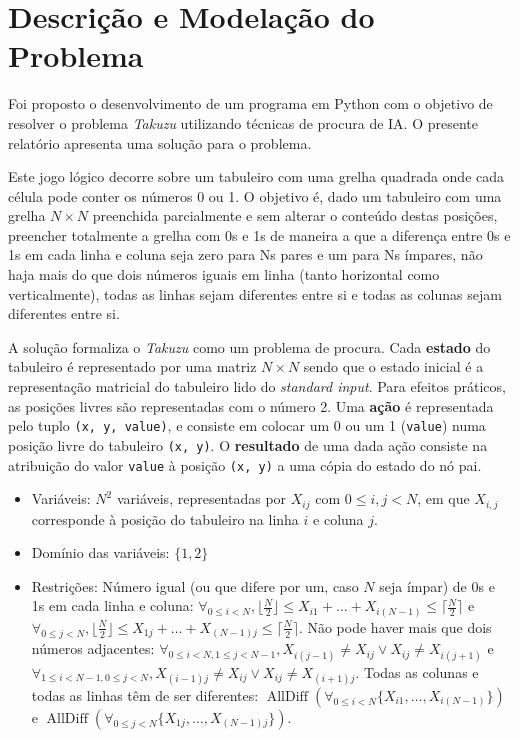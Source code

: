\documentclass[12pt,a4paper]{article}
\newcommand{\op}{\operatorname}
\begin{document}
\section{Descrição e Modelação do Problema}

Foi proposto o desenvolvimento de um programa em Python com o objetivo de resolver o
problema \textit{Takuzu} utilizando técnicas de procura de IA.
O presente relatório apresenta uma solução para o problema.

Este jogo lógico decorre sobre um tabuleiro com uma grelha quadrada onde cada célula
pode conter os números 0 ou 1.
O objetivo é, dado um tabuleiro com uma grelha \(N \times N\) preenchida parcialmente e
sem alterar o conteúdo destas posições, preencher totalmente a grelha com 0s e 1s de maneira
a que a diferença entre 0s e 1s em cada linha e coluna seja zero para Ns pares e um para Ns ímpares,
não haja mais do que dois números iguais em linha (tanto horizontal como verticalmente),
todas as linhas sejam diferentes entre si e todas as colunas sejam diferentes entre si.

A solução formaliza o \textit{Takuzu} como um problema de procura.
Cada \textbf{estado} do tabuleiro é representado por uma matriz \(N \times N\) sendo que o estado inicial
é a representação matricial do tabuleiro lido do \textit{standard input}.
Para efeitos práticos, as posições livres são representadas com o número 2.
Uma \textbf{ação} é representada pelo tuplo \texttt{(x, y, value)}, e consiste em colocar um 0 ou um 1 (\texttt{value})
numa posição livre do tabuleiro \texttt{(x, y)}. O \textbf{resultado} de uma dada ação consiste na
atribuição do valor \texttt{value} à posição \texttt{(x, y)} a uma cópia do estado do nó pai.

\begin{itemize}
  \setlength\itemsep{0em}
  \item Variáveis: \(N^2\) variáveis, representadas por \(X_{ij}\) com \(0 \leq i,j < N\), em que \(X_{i,j}\)
        corresponde à posição do tabuleiro na linha \(i\) e coluna \(j\).
  \item Domínio das variáveis: \(\{1, 2\}\)
  \item Restrições: Número igual (ou que difere por um, caso \(N\) seja ímpar) de 0s e 1s em cada linha e coluna:
        \(\forall_{0\leq i < N}, \lfloor \frac{N}{2} \rfloor \leq X_{i1} + \dots + X_{i(N-1)} \leq \lceil \frac{N}{2} \rceil\)
        e
        \(\forall_{0\leq j < N}, \lfloor \frac{N}{2} \rfloor \leq X_{1j} + \dots + X_{(N-1)j} \leq \lceil \frac{N}{2} \rceil\).
        Não pode haver mais que dois números adjacentes:
        \(\forall_{0\leq i < N, 1\leq j < N-1}, X_{i(j-1)} \ne X_{ij} \lor X_{ij} \ne X_{i(j+1)}\)
        e
        \(\forall_{1\leq i < N-1, 0\leq j < N}, X_{(i-1)j} \ne X_{ij} \lor X_{ij} \ne X_{(i+1)j}\).
        Todas as colunas e todas as linhas têm de ser diferentes:
        \(\op{AllDiff}(\forall_{0\leq i < N} \{X_{i1}, \dots, X_{i(N-1)}\}) \)
        e
        \(\op{AllDiff}(\forall_{0\leq j < N} \{X_{1j}, \dots, X_{(N-1)j}\}) \).
\end{itemize}
\end{document}
